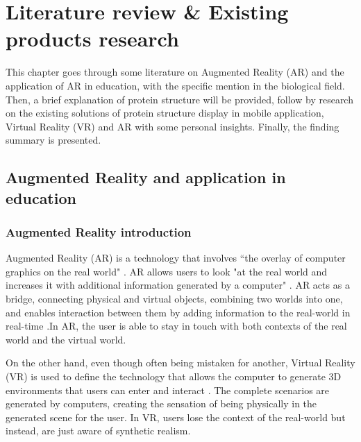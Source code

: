 \chapter{Literature review \& Existing products research}
\label{ch:litRev}

This chapter goes through some literature on Augmented Reality (AR) and the application of AR in education, with the specific mention in the biological field. Then, a brief explanation of protein structure will be provided, follow by research on the existing solutions of protein structure display in mobile application, Virtual Reality (VR) and AR with some personal insights. Finally, the finding summary is presented.

\section{Augmented Reality and application in education}
\subsection{Augmented Reality introduction}
Augmented Reality (AR) is a technology that involves “the overlay of computer graphics on the real world" \parencite{silva_introduction_2003}. AR allows users to look "at the real world and increases it with additional information generated by a computer" \parencite{chamba-eras_augmented_2017}. AR acts as a bridge, connecting physical and virtual objects, combining two worlds into one, and enables interaction between them by adding information to the real-world in real-time \parencite{chamba-eras_augmented_2017}.In AR, the user is able to stay in touch with both contexts of the real world and the virtual world.

On the other hand, even though often being mistaken for another, Virtual Reality (VR) is used to define the technology that allows the computer to generate 3D environments that users can enter and interact  \parencite{silva_introduction_2003}. The complete scenarios are generated by computers, creating the sensation of being physically in the generated scene for the user. In VR, users lose the context of the real-world but instead, are just aware of synthetic realism.

